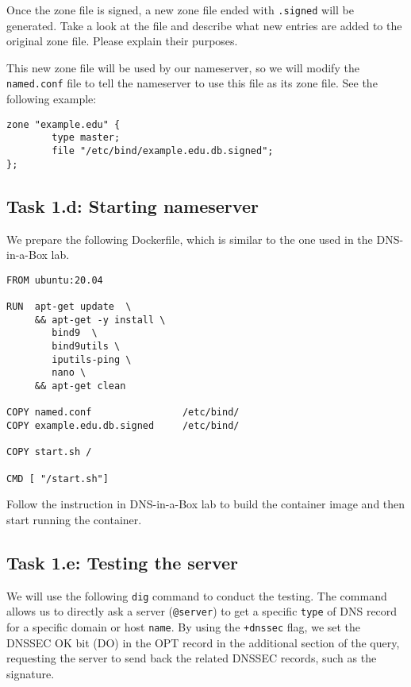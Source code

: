 Once the zone file is signed, a new zone file ended with
\texttt{.signed} will be generated. Take a look at the file and describe 
what new entries are added to the original zone file. Please explain
their purposes. 


This new zone file will be used by our nameserver, so 
we will modify the \texttt{named.conf} file to tell the 
nameserver to use this file as its zone file. See the following 
example: 

\begin{lstlisting}
zone "example.edu" {
        type master;
        file "/etc/bind/example.edu.db.signed";
};
\end{lstlisting}



\subsection{Task 1.d: Starting nameserver}

We prepare the following Dockerfile, which is similar to the one used in 
the DNS-in-a-Box lab. 

\begin{lstlisting}
FROM ubuntu:20.04

RUN  apt-get update  \
     && apt-get -y install \
        bind9  \
        bind9utils \
        iputils-ping \
        nano \
     && apt-get clean

COPY named.conf                /etc/bind/
COPY example.edu.db.signed     /etc/bind/

COPY start.sh /

CMD [ "/start.sh"]
\end{lstlisting}
 
Follow the instruction in DNS-in-a-Box lab to build the container image 
and then start running the container. 


\subsection{Task 1.e: Testing the server}


We will use the following \texttt{dig} command to conduct the testing. 
The command allows us to directly ask 
a server (\texttt{@server}) to get a specific \texttt{type}
of DNS record for a specific domain or host \texttt{name}.
By using the \texttt{+dnssec} flag, we set the DNSSEC OK bit (DO) in the OPT record 
in the additional section of the query, requesting the server to
send back the related DNSSEC records, such as the signature. 

